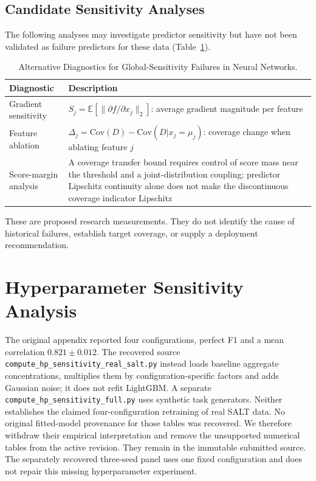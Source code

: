 \documentclass[accepted]{uai2026} %
\begin{document}
\subsection{Candidate Sensitivity Analyses}\label{app:alternative_diagnostics}

The following analyses may investigate predictor sensitivity but have not been validated as failure predictors for these data (Table~\ref{tab:alternative_diagnostics}).

\begin{table}[htbp]
\centering
\caption{Alternative Diagnostics for Global-Sensitivity Failures in Neural Networks.}\label{tab:alternative_diagnostics}
\small
\begin{tabular}{@{}lp{8cm}@{}}
\toprule
Diagnostic & Description \\
\midrule
Gradient sensitivity & $S_j = \mathbb{E}[\|\partial f / \partial x_j\|_2]$: average gradient magnitude per feature \\
Feature ablation & $\Delta_j = \text{Cov}(D) - \text{Cov}(D|x_j=\mu_j)$: coverage change when ablating feature $j$ \\
Score-margin analysis & A coverage transfer bound requires control of score mass near the threshold and a joint-distribution coupling; predictor Lipschitz continuity alone does not make the discontinuous coverage indicator Lipschitz \\
\bottomrule
\end{tabular}


\raggedright
\footnotesize
These are proposed research measurements. They do not identify the cause of historical failures, establish target coverage, or supply a deployment recommendation.
\end{table}

\section{Hyperparameter Sensitivity Analysis}\label{app:hp_sensitivity}

The original appendix reported four configurations, perfect F1 and a mean correlation $0.821\pm0.012$. The recovered source \texttt{compute\_hp\_sensitivity\_real\_salt.py} instead loads baseline aggregate concentrations, multiplies them by configuration-specific factors and adds Gaussian noise; it does not refit LightGBM. A separate \texttt{compute\_hp\_sensitivity\_full.py} uses synthetic task generators. Neither establishes the claimed four-configuration retraining of real SALT data. No original fitted-model provenance for those tables was recovered. We therefore withdraw their empirical interpretation and remove the unsupported numerical tables from the active revision. They remain in the immutable submitted source. The separately recovered three-seed panel uses one fixed configuration and does not repair this missing hyperparameter experiment.
\end{document}
